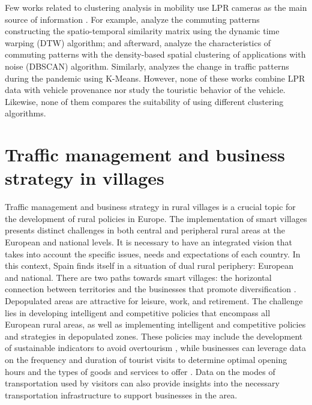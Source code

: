 Few works related to clustering analysis in mobility use LPR cameras as the main source of information \cite{yao2022analysis}. For example, \cite{yao2022analysis} analyze the commuting patterns constructing the spatio-temporal similarity matrix using the dynamic time warping (DTW) algorithm; and afterward, analyze the characteristics of commuting patterns with the density-based spatial clustering of applications with noise (DBSCAN) algorithm. Similarly, \cite{yao2022understanding} analyzes the change in traffic patterns during the pandemic using K-Means. However, none of these works combine LPR data with vehicle provenance nor study the touristic behavior of the vehicle. Likewise, none of them compares the suitability of using different clustering algorithms.

\section{Traffic management and business strategy in villages}

Traffic management and business strategy in rural villages is a crucial topic for the development of rural policies in Europe. The implementation of smart villages presents distinct challenges in both central and peripheral rural areas at the European and national levels. It is necessary to have an integrated vision that takes into account the specific issues, needs and expectations of each country. In this context, Spain finds itself in a situation of dual rural periphery: European and national. There are two paths towards smart villages: the horizontal connection between territories and the businesses that promote diversification \cite{paniagua2020smart}. Depopulated areas are attractive for leisure, work, and retirement. The challenge lies in developing intelligent and competitive policies that encompass all European rural areas, as well as implementing intelligent and competitive policies and strategies in depopulated zones. These policies may include the development of sustainable indicators to avoid overtourism \cite{pechlaner2019overtourism}, while businesses can leverage data on the frequency and duration of tourist visits to determine optimal opening hours and the types of goods and services to offer \cite{xie2022marketing}. Data on the modes of transportation used by visitors can also provide insights into the necessary transportation infrastructure to support businesses in the area.

